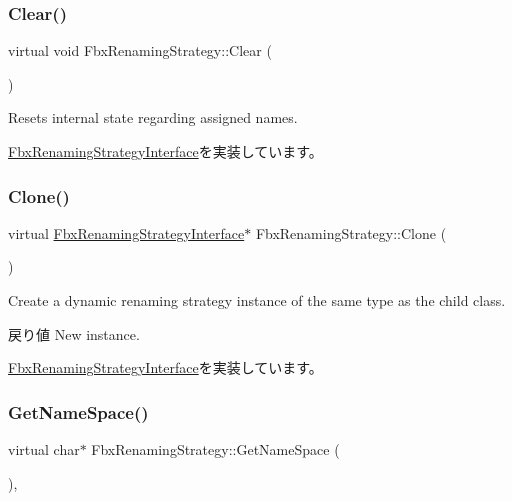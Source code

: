 \subsubsection{\texorpdfstring{Clear()}{Clear()}}
{\footnotesize\ttfamily virtual void Fbx\+Renaming\+Strategy\+::\+Clear (\begin{DoxyParamCaption}{ }\end{DoxyParamCaption})\hspace{0.3cm}{\ttfamily [virtual]}}



Resets internal state regarding assigned names. 



\hyperlink{class_fbx_renaming_strategy_interface_a2090b5ae43936b617ec5d75015923f69}{Fbx\+Renaming\+Strategy\+Interface}を実装しています。

\mbox{\label{class_fbx_renaming_strategy_a36d1f3cc01ea460ab97d95fc8d8dd136}} 
\subsubsection{\texorpdfstring{Clone()}{Clone()}}
{\footnotesize\ttfamily virtual \hyperlink{class_fbx_renaming_strategy_interface}{Fbx\+Renaming\+Strategy\+Interface}$\ast$ Fbx\+Renaming\+Strategy\+::\+Clone (\begin{DoxyParamCaption}{ }\end{DoxyParamCaption})\hspace{0.3cm}{\ttfamily [virtual]}}

Create a dynamic renaming strategy instance of the same type as the child class. \begin{DoxyReturn}{戻り値}
New instance. 
\end{DoxyReturn}


\hyperlink{class_fbx_renaming_strategy_interface_ab394ed8a9b5d3ec40334bc933af83907}{Fbx\+Renaming\+Strategy\+Interface}を実装しています。

\mbox{\label{class_fbx_renaming_strategy_a52dcb44dfa0ee8e965aa81b0b233611a}} 
\subsubsection{\texorpdfstring{Get\+Name\+Space()}{GetNameSpace()}}
{\footnotesize\ttfamily virtual char$\ast$ Fbx\+Renaming\+Strategy\+::\+Get\+Name\+Space (\begin{DoxyParamCaption}{ }\end{DoxyParamCaption})\hspace{0.3cm}{\ttfamily [inline]}, {\ttfamily [virtual]}}

